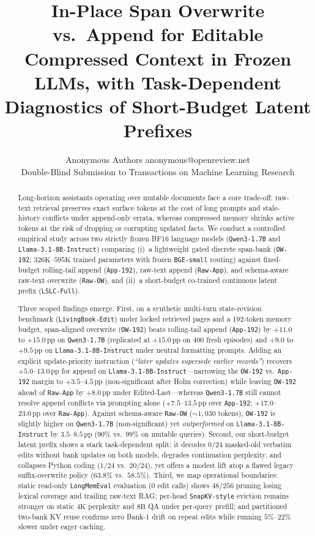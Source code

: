 \documentclass[10pt]{article}
\title{In-Place Span Overwrite vs.\ Append for Editable Compressed Context in Frozen LLMs, with Task-Dependent Diagnostics of Short-Budget Latent Prefixes}
\author{\name Anonymous Authors \email anonymous@openreview.net \\
\addr Double-Blind Submission to Transactions on Machine Learning Research}
\newcommand{\pp}{\,\text{pp}}
\renewcommand{\_}{\origunderscore\allowbreak}
\begin{document}
\maketitle

\begin{abstract}
Long-horizon assistants operating over mutable documents face a core trade-off: raw-text retrieval preserves exact surface tokens at the cost of long prompts and stale-history conflicts under append-only errata, whereas compressed memory shrinks active tokens at the risk of dropping or corrupting updated facts. We conduct a controlled empirical study across two strictly frozen BF16 language models (\texttt{Qwen3-1.7B} and \texttt{Llama-3.1-8B-Instruct}) comparing (i)~a lightweight gated discrete span-bank (\texttt{OW-192}; $326\text{K}$--$595\text{K}$ trained parameters with frozen \texttt{BGE-small} routing) against fixed-budget rolling-tail append (\texttt{App-192}), raw-text append (\texttt{Raw-App}), and schema-aware raw-text overwrite (\texttt{Raw-OW}), and (ii)~a short-budget co-trained continuous latent prefix (\texttt{LSLC-Full}).

Three scoped findings emerge. First, on a synthetic multi-turn state-revision benchmark (\texttt{LivingBook-Edit}) under locked retrieved pages and a $192$-token memory budget, span-aligned overwrite (\texttt{OW-192}) beats rolling-tail append (\texttt{App-192}) by $+11.0$ to $+15.0\pp$ on \texttt{Qwen3-1.7B} (replicated at $+15.0\pp$ on $400$ fresh episodes) and $+9.0$ to $+9.5\pp$ on \texttt{Llama-3.1-8B-Instruct} under neutral formatting prompts. Adding an explicit update-priority instruction (\emph{``later updates supersede earlier records''}) recovers $+5.0$--$13.0\pp$ for append on \texttt{Llama-3.1-8B-Instruct}---narrowing the \texttt{OW-192} vs.\ \texttt{App-192} margin to $+3.5$--$4.5\pp$ (non-significant after Holm correction) while leaving \texttt{OW-192} ahead of \texttt{Raw-App} by $+8.0\pp$ under Edited-Last---whereas \texttt{Qwen3-1.7B} still cannot resolve append conflicts via prompting alone ($+7.5$--$13.5\pp$ over \texttt{App-192}; $+17.0$--$23.0\pp$ over \texttt{Raw-App}). Against schema-aware \texttt{Raw-OW} ($\sim 1{,}030$ tokens), \texttt{OW-192} is slightly higher on \texttt{Qwen3-1.7B} (non-significant) yet \emph{outperformed} on \texttt{Llama-3.1-8B-Instruct} by $3.5$--$8.5\pp$ ($90\%$ vs.\ $99\%$ on mutable queries). Second, our short-budget latent prefix shows a stark task-dependent split: it decodes $0/24$ masked-old verbatim edits without bank updates on both models, degrades continuation perplexity, and collapses Python coding ($1/24$ vs.\ $20/24$), yet offers a modest lift atop a flawed legacy suffix-overwrite policy ($63.8\%$ vs.\ $58.5\%$). Third, we map operational boundaries: static read-only \texttt{LongMemEval} evaluation ($0$ edit calls) shows $48/256$ pruning losing lexical coverage and trailing raw-text RAG; per-head \texttt{SnapKV-style} eviction remains stronger on static $4\text{K}$ perplexity and $8\text{B}$ QA under per-query prefill; and partitioned two-bank KV reuse confirms zero Bank-1 drift on repeat edits while running $5\%$--$22\%$ slower under eager caching.
\end{abstract}
\end{document}

